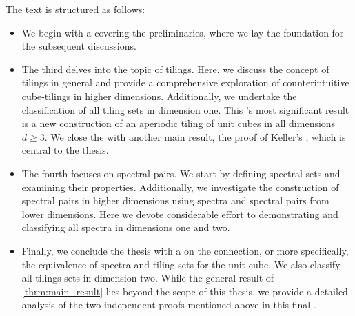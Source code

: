 \documentclass[../thesis.tex]{subfiles}
\begin{document}
%
The text is structured as follows:
\begin{itemize}
  \item We begin with a  covering the preliminaries, where we lay the foundation for the subsequent discussions.
  \item The third  delves into the topic of tilings. Here, we discuss the concept of tilings in general and provide a comprehensive exploration of counterintuitive cube-tilings in higher dimensions. Additionally, we undertake the classification of all tiling sets in dimension one. This 's most significant result is a new construction of an aperiodic tiling of unit cubes in all dimensions $d\geq3$. We close the  with another main result, the proof of Keller's , which is central to the thesis.
  \item The fourth  focuses on spectral pairs. We start by defining spectral sets and examining their properties. Additionally, we investigate the construction of spectral pairs in higher dimensions using spectra and spectral pairs from lower dimensions. Here we devote considerable effort to demonstrating and classifying all spectra in dimensions one and two.
  \item Finally, we conclude the thesis with a  on the connection, or more specifically, the equivalence of spectra and tiling sets for the unit cube. We also classify all tilings sets in dimension two. While the general result of \cref{thrm:main_result} lies beyond the scope of this thesis, we provide a detailed analysis of the two independent proofs mentioned above in this final .
\end{itemize}
\end{document}
